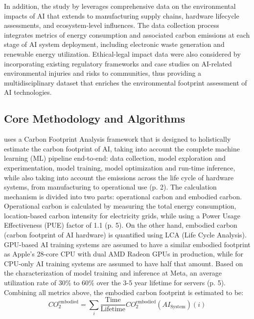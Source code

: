 \documentclass[a4paper, 12pt]{article}
\begin{document}
\hspace{24pt}In addition, the study by \citet{Zhuk2023} leverages comprehensive data on the environmental impacts of AI that extends to manufacturing supply chains, hardware lifecycle assessments, and ecosystem-level influences. The data collection process integrates metrics of energy consumption and associated carbon emissions at each stage of AI system deployment, including electronic waste generation and renewable energy utilization. Ethical-legal impact data were also considered by incorporating existing regulatory frameworks and case studies on AI-related environmental injuries and risks to communities, thus providing a multidisciplinary dataset that enriches the environmental footprint assessment of AI technologies.

\subsection{Core Methodology and Algorithms} 
\hspace{24pt}\citet{Wu2022} uses a Carbon Footprint Analysis framework that is designed to holistically estimate the carbon footprint of AI, taking into account the complete machine learning (ML) pipeline end-to-end: data collection, model exploration and experimentation, model training, model optimization and run-time inference, while also taking into account the emissions across the life cycle of hardware systems, from manufacturing to operational use (p. 2). The calculation mechanism is divided into two parts: operational carbon and embodied carbon. Operational carbon is calculated by measuring the total energy consumption, location-based carbon intensity for electricity grids, while using a Power Usage Effectiveness (PUE) factor of 1.1 (p. 5). On the other hand, embodied carbon (carbon footprint of AI hardware) is quantified using LCA (Life Cycle Analysis). GPU-based AI training systems are assumed to have a similar embodied footprint as Apple's 28-core CPU with dual AMD Radeon GPUs in production, while for CPU-only AI training systems are assumed to have half that amount.  Based on the characterization of model training and inference at Meta, an average utilization rate of 30\% to 60\% over the 3-5 year lifetime for servers (p. 5). Combining all metrics above, the embodied carbon footprint is estimated to be: 
\begin{equation}
	CO_2^{\text{embodied}} = \sum_i \frac{\text{Time}}{\text{Lifetime}} CO_2^{\text{embodied}}(AI_{\text{System}})(i)
\end{equation}
\end{document}
